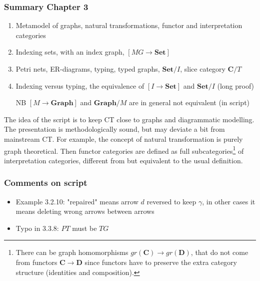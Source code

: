 \documentclass[handout]{beamer}
\newcommand{\bfsf}[1]{{\boldsymbol{#1}}}
\newcommand{\Set}{\bfsf{Set}}
\newcommand{\Gra}{\bfsf{Graph}}
\newcommand{\CC}{\bfsf{C}}
\newcommand{\DD}{\bfsf{D}}
\begin{document}
\frame
  {   
    \frametitle{Summary Chapter 3}\label{Ch3:Summary}

 \begin{enumerate}[<+->]
\item Metamodel of graphs, natural transformations, functor and interpretation categories
\item Indexing sets, with an index graph, $[MG\to\Set]$
\item Petri nets, ER-diagrams, typing, typed graphs, $\Set/I$, slice category $\CC/T$
\item Indexing versus typing, the equivalence of $[I\to\Set]$ and $\Set/I$ (long proof)
\item[NB] $[M\to\Gra]$ and $\Gra/M$ are in general not equivalent (in script)
 \end{enumerate}\scriptsize
The idea of the script is to keep CT close to graphs and diagrammatic
modelling. The presentation is methodologically sound,
but may deviate a bit from mainstream CT. 
For example, the concept of natural transformation  is purely graph theoretical.
Then functor categories are defined as full subcategories\footnote{\tiny%
There can be graph homomorphisms $gr(\CC)\to gr(\DD)$,
that do not come from functors $\CC\to\DD$ since functors have
to preserve the extra category structure (identities and composition).}
of interpretation categories, different from but equivalent to the usual definition.

}



\frame
  {   
    \frametitle{Comments on script}\label{Ch3:comments}

 \begin{itemize}[<+->]
\item Example 3.2.10: "repaired"  means arrow $d$ reversed to keep $\gamma$,
in other cases it means deleting wrong arrows between arrows
\item Typo in 3.3.8: $PT$ must be $TG$
 \end{itemize}

 }
\end{document}
